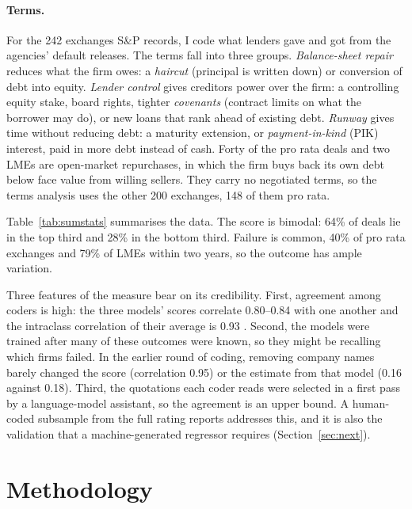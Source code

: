 \documentclass[12pt]{article}
\begin{document}
\paragraph{Terms.} For the 242 exchanges S\&P records, I code what lenders gave and got from the agencies' default releases. The terms fall into three groups. \emph{Balance-sheet repair} reduces what the firm owes: a \emph{haircut} (principal is written down) or conversion of debt into equity. \emph{Lender control} gives creditors power over the firm: a controlling equity stake, board rights, tighter \emph{covenants} (contract limits on what the borrower may do), or new loans that rank ahead of existing debt. \emph{Runway} gives time without reducing debt: a maturity extension, or \emph{payment-in-kind} (PIK) interest, paid in more debt instead of cash. Forty of the pro rata deals and two LMEs are open-market repurchases, in which the firm buys back its own debt below face value from willing sellers. They carry no negotiated terms, so the terms analysis uses the other 200 exchanges, 148 of them pro rata.



Table~\ref{tab:sumstats} summarises the data. The score is bimodal: 64\% of deals lie in the top third and 28\% in the bottom third. Failure is common, 40\% of pro rata exchanges and 79\% of LMEs within two years, so the outcome has ample variation.

Three features of the measure bear on its credibility. First, agreement among coders is high: the three models' scores correlate 0.80--0.84 with one another and the intraclass correlation of their average is 0.93 \citep{koo2016}. Second, the models were trained after many of these outcomes were known, so they might be recalling which firms failed. In the earlier round of coding, removing company names barely changed the score (correlation 0.95) or the estimate from that model (0.16 against 0.18). Third, the quotations each coder reads were selected in a first pass by a language-model assistant, so the agreement is an upper bound. A human-coded subsample from the full rating reports addresses this, and it is also the validation that a machine-generated regressor requires \citep{ludwig2025} (Section~\ref{sec:next}).

\section{Methodology}
\label{sec:method}
\end{document}
